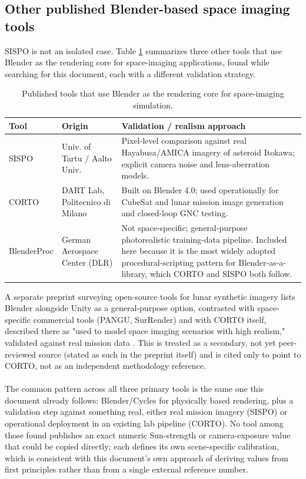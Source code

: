 \subsection{Other published Blender-based space imaging tools}

SISPO is not an isolated case. Table \ref{tab:blender-space-tools} summarizes three other tools that use Blender as the rendering core for space-imaging applications, found while searching for this document, each with a different validation strategy.

\begin{table}[!ht]
\centering
\small
\caption{Published tools that use Blender as the rendering core for space-imaging simulation.}
\label{tab:blender-space-tools}
\begin{tabularx}{\textwidth}{p{} p{} X}
\toprule
\textbf{Tool} & \textbf{Origin} & \textbf{Validation / realism approach} \\
\midrule
SISPO \cite{sispo2022} & Univ. of Tartu / Aalto Univ. & Pixel-level comparison against real Hayabusa/AMICA imagery of asteroid Itokawa; explicit camera noise and lens-aberration models. \\
CORTO \cite{pugliatti2023corto} & DART Lab, Politecnico di Milano & Built on Blender 4.0; used operationally for CubeSat and lunar mission image generation and closed-loop GNC testing. \\
BlenderProc \cite{denninger2019blenderproc} & German Aerospace Center (DLR) & Not space-specific; general-purpose photorealistic training-data pipeline. Included here because it is the most widely adopted procedural-scripting pattern for Blender-as-a-library, which CORTO and SISPO both follow. \\
\bottomrule
\end{tabularx}
\end{table}

A separate preprint surveying open-source tools for lunar synthetic imagery lists Blender alongside Unity as a general-purpose option, contrasted with space-specific commercial tools (PANGU, SurRender) and with CORTO itself, described there as "used to model space imaging scenarios with high realism," validated against real mission data \cite{singla2026lunarsim}. This is treated as a secondary, not yet peer-reviewed source (stated as such in the preprint itself) and is cited only to point to CORTO, not as an independent methodology reference.
\\\\
The common pattern across all three primary tools is the same one this document already follows: Blender/Cycles for physically based rendering, plus a validation step against something real, either real mission imagery (SISPO) or operational deployment in an existing lab pipeline (CORTO). No tool among those found publishes an exact numeric Sun-strength or camera-exposure value that could be copied directly; each defines its own scene-specific calibration, which is consistent with this document's own approach of deriving values from first principles rather than from a single external reference number.

